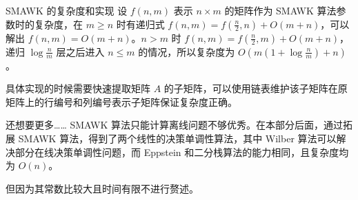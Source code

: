 \documentclass{beamer}
\begin{document}
\begin{frame}{SMAWK 的复杂度和实现}
	设 $f(n,m)$ 表示 $n \times m$ 的矩阵作为 SMAWK 算法参数时的复杂度，在 $m \geq n$ 时有递归式 $f(n,m) = f(\frac{n}{2} , n) + O(m+n)$，可以解出 $f(n,m) = O(m+n)$。$n > m$ 时 $f(n,m) = f(\frac{n}{2} , m) + O(m+n)$，递归 $\log \frac{n}{m}$ 层之后进入 $n \leq m$ 的情况，所以复杂度为 $O(m(1 + \log \frac{n}{m}) + n)$。
	
	具体实现的时候需要快速提取矩阵 $A$ 的子矩阵，可以使用链表维护该子矩阵在原矩阵上的行编号和列编号表示子矩阵保证复杂度正确。
\end{frame}
\begin{frame}{还想要更多……}
	SMAWK 算法只能计算离线问题不够优秀。在本部分后面，通过拓展 SMAWK 算法，得到了两个线性的决策单调性算法，其中 Wilber 算法可以解决部分在线决策单调性问题，而 Eppstein 和二分栈算法的能力相同，且复杂度均为 $O(n)$。
	
	但因为其常数比较大且时间有限不进行赘述。
\end{frame}
\end{document}
